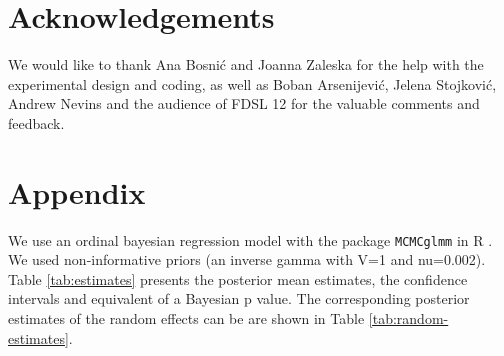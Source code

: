 \documentclass[output=paper,
modfonts,
newtxmath,
hidelinks
]{langscibook}
\begin{document}
\section*{Acknowledgements}

We would like to thank Ana Bosni\'{c} and Joanna Zaleska for the help with the experimental design and coding, as well as Boban Arsenijevi\'{c}, Jelena Stojkovi\'{c}, Andrew Nevins and the audience of FDSL 12 for the valuable comments and feedback.   

{\sloppy
\printbibliography[heading=subbibliography,notkeyword=this]
}

\section*{Appendix}	
		
We use an ordinal bayesian regression model with the package \texttt{MCMCglmm} \citep{Hadfield.2010} in R \citep{rcore}. We used non-informative priors (an inverse gamma with V=1 and nu=0.002).  Table \ref{tab:estimates} presents the posterior mean estimates, the confidence intervals and equivalent of a Bayesian p value. The corresponding posterior estimates of the random effects can be are shown in Table \ref{tab:random-estimates}.
\end{document}
